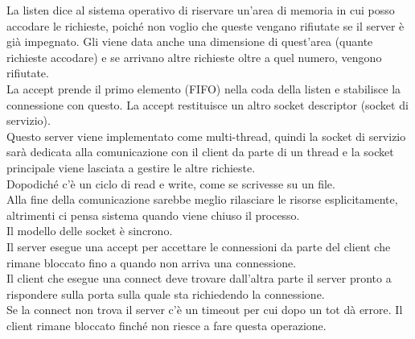 La listen dice al sistema operativo di riservare un'area di memoria in cui posso accodare le richieste, poiché non voglio che queste vengano rifiutate se il server è già impegnato. Gli viene data anche una dimensione di quest'area (quante richieste accodare) e se arrivano altre richieste oltre a quel numero, vengono rifiutate. \\
La accept prende il primo elemento (FIFO) nella coda della listen e stabilisce la connessione con questo. La accept restituisce un altro socket descriptor (socket di servizio).\\
Questo server viene implementato come multi-thread, quindi la socket di servizio sarà dedicata alla comunicazione con il client da parte di un thread e la socket principale viene lasciata a gestire le altre richieste. \\
Dopodiché c'è un ciclo di read e write, come se scrivesse su un file. \\
Alla fine della comunicazione sarebbe meglio rilasciare le risorse esplicitamente, altrimenti ci pensa sistema quando viene chiuso il processo.\\

Il modello delle socket è sincrono. \\
Il server esegue una accept per accettare le connessioni da parte del client che rimane bloccato fino a quando non arriva una connessione. \\
Il client che esegue una connect deve trovare dall'altra parte il server pronto a rispondere sulla porta sulla quale sta richiedendo la connessione. \\
Se la connect non trova il server c'è un timeout per cui dopo un tot dà errore. Il client rimane bloccato finché non riesce a fare questa operazione.

